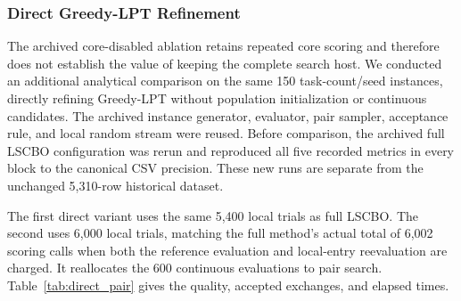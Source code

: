 \documentclass[pdflatex,onecolumn,sn-mathphys-num]{sn-jnl}
\begin{document}
\begin{table}[ht]
\centering
\caption{Cloud mechanism ablation, averaged over 150 paired blocks. Cost uses synthetic model units; $\mathcal{I}$ and $F$ are dimensionless.}\label{tab:phase_ablation}
\end{table}

\FloatBarrier
\subsubsection{Direct Greedy-LPT Refinement}\label{sec:direct_pair}
The archived core-disabled ablation retains repeated core scoring and therefore does not establish the value of keeping the complete search host. We conducted an additional analytical comparison on the same 150 task-count/seed instances, directly refining Greedy-LPT without population initialization or continuous candidates. The archived instance generator, evaluator, pair sampler, acceptance rule, and local random stream were reused. Before comparison, the archived full LSCBO configuration was rerun and reproduced all five recorded metrics in every block to the canonical CSV precision. These new runs are separate from the unchanged 5,310-row historical dataset.

The first direct variant uses the same 5,400 local trials as full LSCBO. The second uses 6,000 local trials, matching the full method's actual total of 6,002 scoring calls when both the reference evaluation and local-entry reevaluation are charged. It reallocates the 600 continuous evaluations to pair search. Table~\ref{tab:direct_pair} gives the quality, accepted exchanges, and elapsed times.
\end{document}
